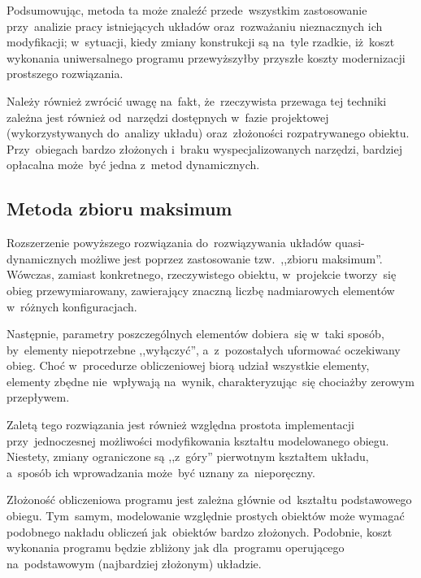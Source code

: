 Podsumowując, metoda ta może znaleźć przede~wszystkim zastosowanie
przy~analizie pracy istniejących układów oraz~rozważaniu nieznacznych
ich modyfikacji; w~sytuacji, kiedy zmiany konstrukcji są na~tyle
rzadkie, iż~koszt wykonania uniwersalnego programu przewyższyłby
przyszłe koszty modernizacji prostszego rozwiązania.

Należy również zwrócić uwagę na~fakt, że~rzeczywista przewaga tej
techniki zależna jest również od~narzędzi dostępnych w~fazie projektowej
(wykorzystywanych do~analizy układu) oraz~złożoności rozpatrywanego
obiektu. Przy~obiegach bardzo złożonych i~braku wyspecjalizowanych
narzędzi, bardziej opłacalna może~być jedna z~metod dynamicznych.


\subsection{Metoda zbioru maksimum}

Rozszerzenie powyższego rozwiązania do~rozwiązywania układów
quasi-dynamicznych możliwe jest poprzez zastosowanie tzw.~,,zbioru
maksimum''. Wówczas, zamiast konkretnego, rzeczywistego obiektu,
w~projekcie tworzy~się obieg przewymiarowany, zawierający znaczną
liczbę nadmiarowych elementów w~różnych konfiguracjach.

Następnie, parametry poszczególnych elementów dobiera~się w~taki sposób,
by~elementy niepotrzebne ,,wyłączyć'', a~z~pozostałych uformować
oczekiwany obieg. Choć w~procedurze obliczeniowej biorą udział wszystkie
elementy, elementy zbędne nie~wpływają na~wynik, charakteryzując~się
chociażby zerowym przepływem.

Zaletą tego rozwiązania jest również względna prostota implementacji
przy~jednoczesnej możliwości modyfikowania kształtu modelowanego obiegu.
Niestety, zmiany ograniczone są ,,z~góry'' pierwotnym kształtem układu,
a~sposób ich wprowadzania może~być uznany za~nieporęczny.

Złożoność obliczeniowa programu jest zależna głównie od~kształtu
podstawowego obiegu. Tym~samym, modelowanie względnie prostych obiektów
może wymagać podobnego nakładu obliczeń jak~obiektów bardzo złożonych.
Podobnie, koszt wykonania programu będzie zbliżony jak dla~programu
operującego na~podstawowym (najbardziej złożonym) układzie.
